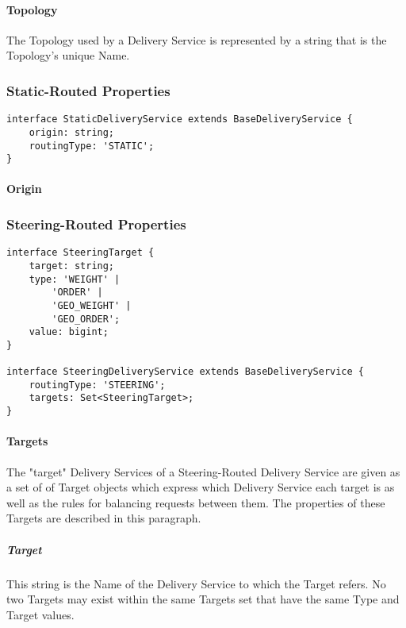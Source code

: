 \paragraph{Topology}
The Topology used by a Delivery Service is represented by a string that is the
Topology's unique Name.

\subsubsection{Static-Routed Properties}
\begin{codelisting}
\begin{verbatim}
interface StaticDeliveryService extends BaseDeliveryService {
	origin: string;
	routingType: 'STATIC';
}
\end{verbatim}
\end{codelisting}

\paragraph{Origin}

\subsubsection{Steering-Routed Properties}
\begin{codelisting}
\begin{verbatim}
interface SteeringTarget {
	target: string;
	type: 'WEIGHT' |
		'ORDER' |
		'GEO_WEIGHT' |
		'GEO_ORDER';
	value: bigint;
}

interface SteeringDeliveryService extends BaseDeliveryService {
	routingType: 'STEERING';
	targets: Set<SteeringTarget>;
}
\end{verbatim}
\end{codelisting}

\paragraph{Targets}
The "target" Delivery Services of a Steering-Routed Delivery Service are given
as a set of of Target objects which express which Delivery Service each target
is as well as the rules for balancing requests between them. The properties of
these Targets are described in this paragraph.

\subparagraph{Target}
This string is the Name of the Delivery Service to which the Target refers. No
two Targets may exist within the same Targets set that have the same Type and
Target values.

